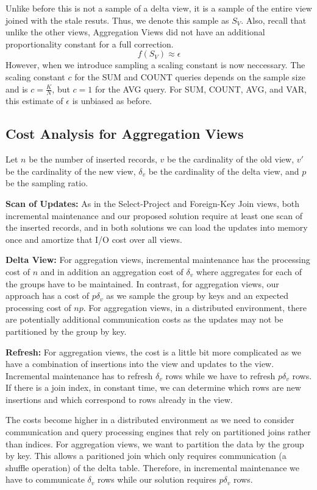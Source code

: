 Unlike before this is not a sample of a delta view, it is a sample of the entire view joined with the stale resuts.
Thus, we denote this sample as $S_{V}$.
Also, recall that unlike the other views, Aggregation Views did not have 
an additional proportionality constant for a full correction.
\[
f(S_{V})\approx\epsilon
\]
However, when we introduce sampling a scaling constant is now neccessary.
The scaling constant $c$ for the SUM and COUNT queries depends on the sample size and is $c = \frac{K}{N}$, 
but $c = 1$ for the AVG query.
For SUM, COUNT, AVG, and VAR, this estimate of $\epsilon$ is unbiased as before.

\subsection{Cost Analysis for Aggregation Views}
Let $n$ be the number of inserted records, $v$ be the cardinality of the old view, $v'$ be the cardinality of the new view, $\delta_v$ be the cardinality of the delta view, and $p$ be the sampling ratio.  

\textbf{Scan of Updates: }
As in the Select-Project and Foreign-Key Join views, both incremental maintenance and our proposed solution require at least one scan of the inserted records, and in both solutions we can load the updates into memory once and amortize that I/O cost over all views. 

\textbf{Delta View: }  For aggregation views, incremental maintenance has the processing cost of $n$ and in addition an aggregation cost of $\delta_v$ where aggregates for each of the groups have to be maintained. In contrast, for aggregation views, our approach has a cost of $p\delta_v$ as we sample the group by keys and an expected processing cost of $np$. 
For aggregation views, in a distributed environment, there are potentially additional communication costs as the updates may not be partitioned by the group by key.

\textbf{Refresh: } For aggregation views, the cost is a little bit more complicated as we have a combination of insertions into the view and updates to the view. 
Incremental maintenance has to refresh $\delta_v$ rows while we have to refresh $p\delta_v$ rows. 
If there is a join index, in constant time, we can determine which rows are new insertions and which correspond to rows already in the view.

The costs become higher in a distributed environment as we need to consider communication and query processing engines that rely on partitioned joins rather than indices.
For aggregation views, we want to partition the data by the group by key.
This allows a paritioned join which only requires communication (a shuffle operation) of the delta table.
Therefore, in incremental maintenance we have to communicate $\delta_v$ rows while our solution requires $p\delta_v$ rows.

